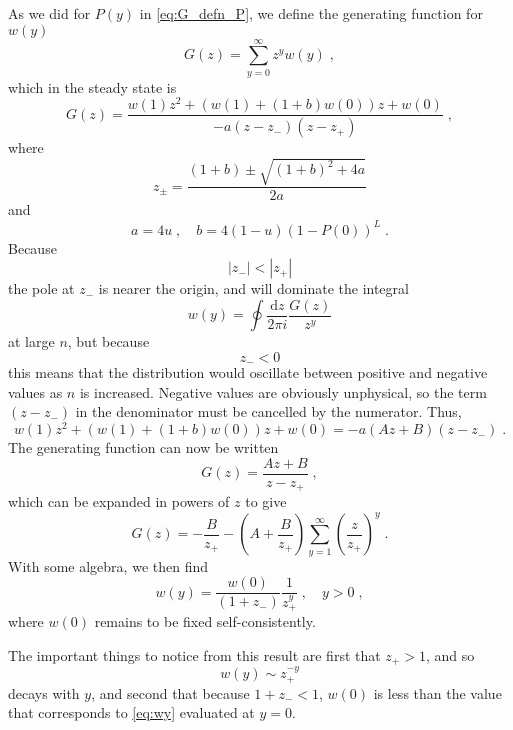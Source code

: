 \documentclass[a4paper,10pt]{article}
\newcommand{\D}{\mathrm{d}}
\newcommand{\pzero}{P(0)}
\newcommand{\wone}{w(1)}
\newcommand{\wzero}{w(0)}
\newcommand{\wy}{w(y)}
\begin{document}
As we did for $P(y)$ in \eqref{eq:G_defn_P}, we define the generating function for $\wy$
\begin{equation}\label{eq:G_defn_w}
 G(z) = \sum_{y=0}^{\infty}z^y \wy \;,
\end{equation}
which in the steady state is
\begin{equation}
  G(z) = \frac{\wone z^2 + (\wone + (1+b)\wzero)z + \wzero}{-a(z-z_-)(z-z_+)} \;,
\end{equation}
where
\begin{equation}
  z_\pm = \frac{ (1+b) \pm \sqrt{ (1+b)^2 + 4a }}{2a}
\end{equation}
and
\begin{equation}
  a = 4u \;, \quad b = 4(1-u)(1-\pzero)^L \;.
\end{equation}
Because
\begin{equation}
  |z_-| < |z_+|
\end{equation}
the pole at $z_-$ is nearer the origin, and will dominate the integral
\begin{equation}
 \wy = \oint \frac{\D z}{2\pi i} \frac{G(z)}{z^y}
\end{equation}
at large $n$, but because 
\begin{equation}
  z_- < 0 
\end{equation}
this means that the distribution would oscillate between positive and negative values as $n$ is increased. Negative values are obviously unphysical, so the term $(z-z_-)$ in the denominator must be cancelled by the numerator. Thus,
\begin{equation}\label{eq:Gz_numerator}
  \wone z^2 + (\wone + (1+b)\wzero)z + \wzero = -a(Az+B)(z-z_-)\;.
\end{equation}
The generating function can now be written
\begin{equation}
  G(z) = \frac{Az + B}{z-z_+} \;,
\end{equation}
which can be expanded in powers of $z$ to give
\begin{equation}
  G(z) = -\frac{B}{z_+} - \left( A + \frac{B}{z_+} \right) \sum_{y=1}^\infty \left( \frac{z}{z_+} \right)^y \;.
\end{equation}
With some algebra, we then find
\begin{equation}\label{eq:wy}
  \wy = \frac{\wzero}{(1+z_-)} \frac{1}{z_+^y} \;, \quad y>0 \;,
\end{equation}
where $\wzero$ remains to be fixed self-consistently.

The important things to notice from this result are first that $z_+ > 1$, and so 
\begin{equation}
  \wy \sim z_+^{-y}
\end{equation}
decays with $y$, and second that because $1 + z_- < 1$, $w(0)$ is less than the value that corresponds to \eqref{eq:wy} evaluated at $y=0$.  
\end{document}
